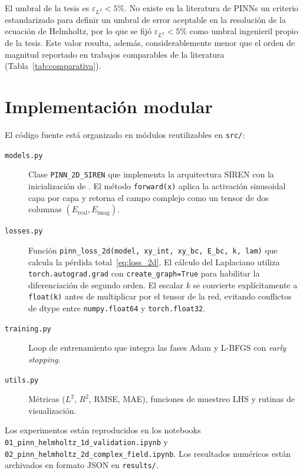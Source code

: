 El umbral de la tesis es $\varepsilon_{L^2} < 5\%$. No existe en la literatura
de PINNs un criterio estandarizado para definir un umbral de error aceptable
en la resolución de la ecuación de Helmholtz, por lo que se fijó
$\varepsilon_{L^2} < 5\%$ como umbral ingenieril propio de la tesis. Este
valor resulta, además, considerablemente menor que el orden de magnitud
reportado en trabajos comparables de la literatura
(Tabla~\ref{tab:comparativa}).

\section{Implementación modular}

El código fuente está organizado en módulos reutilizables en \texttt{src/}:

\begin{description}
    \item[\texttt{models.py}] Clase \texttt{PINN\_2D\_SIREN} que implementa
    la arquitectura SIREN con la inicialización de \textcite{sitzmann2020siren}.
    El método \texttt{forward(x)} aplica la activación sinusoidal capa por capa
    y retorna el campo complejo como un tensor de dos columnas
    $(E_\text{real}, E_\text{imag})$.

    \item[\texttt{losses.py}] Función \texttt{pinn\_loss\_2d(model, xy\_int,
    xy\_bc, E\_bc, k, lam)} que calcula la pérdida total~\eqref{eq:loss_2d}.
    El cálculo del Laplaciano utiliza \texttt{torch.autograd.grad} con
    \texttt{create\_graph=True} para habilitar la diferenciación de segundo orden.
    El escalar $k$ se convierte explícitamente a \texttt{float(k)} antes de
    multiplicar por el tensor de la red, evitando conflictos de dtype entre
    \texttt{numpy.float64} y \texttt{torch.float32}.

    \item[\texttt{training.py}] Loop de entrenamiento que integra las fases
    Adam y L-BFGS con \textit{early stopping}.

    \item[\texttt{utils.py}] Métricas ($L^2$, $R^2$, RMSE, MAE), funciones de
    muestreo LHS y rutinas de visualización.
\end{description}

Los experimentos están reproducidos en los notebooks
\texttt{01\_pinn\_helmholtz\_1d\_validation.ipynb} y
\texttt{02\_pinn\_helmholtz\_2d\_complex\_field.ipynb}.
Los resultados numéricos están archivados en formato JSON en \texttt{results/}.
